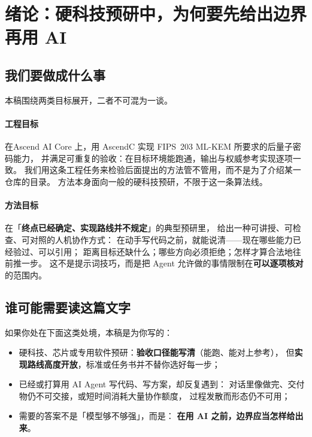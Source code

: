 \documentclass[UTF8,a4paper,11pt]{ctexart}
\theoremstyle{definition}
\theoremstyle{plain}
\theoremstyle{remark}
\numberwithin{figure}{section}
\numberwithin{table}{section}
\begin{document}
\section{绪论：硬科技预研中，为何要先给出边界再用 AI}
\label{sec:intro}

\subsection{我们要做成什么事}

本稿围绕两类目标展开，二者不可混为一谈。

\paragraph{工程目标}
在Ascend AI Core 上，用 AscendC 实现 FIPS~203 ML-KEM 所要求的后量子密码能力，
并满足可重复的验收：在目标环境能跑通，输出与权威参考实现逐项一致。
我们用这条工程任务来检验后面提出的方法管不管用，而不是为了介绍某一仓库的目录。
方法本身面向一般的硬科技预研，不限于这一条算法线。

\paragraph{方法目标}
在「\textbf{终点已经确定、实现路线并不规定}」的典型预研里，
给出一种可讲授、可检查、可对照的人机协作方式：
在动手写代码之前，就能说清——现在哪些能力已经验过、可以引用；
距离目标还缺什么；哪些方向必须拒绝；怎样才算合法地往前推一步。
这不是提示词技巧，而是把 Agent 允许做的事情限制在\textbf{可以逐项核对}的范围内。

\subsection{谁可能需要读这篇文字}

如果你处在下面这类处境，本稿是为你写的：

\begin{itemize}
  \item 硬科技、芯片或专用软件预研：\textbf{验收口径能写清}（能跑、能对上参考），
        但\textbf{实现路线高度开放}，标准或任务书并不替你选好每一步；
  \item 已经或打算用 AI Agent 写代码、写方案，却反复遇到：
        对话里像做完、交付物仍不可交接，或短时间消耗大量协作额度，
        过程发散而形态仍不可用；
  \item 需要的答案不是「模型够不够强」，而是：
        \textbf{在用 AI 之前，边界应当怎样给出来}。
\end{itemize}
\end{document}

